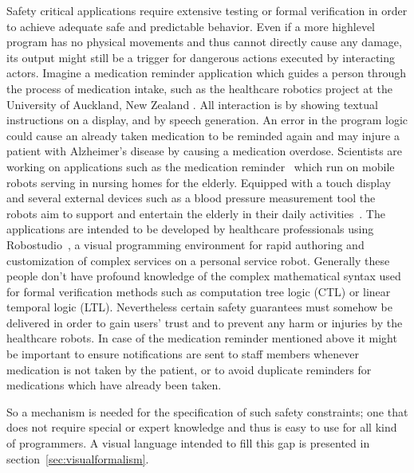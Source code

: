 \documentclass[conference]{IEEEtran}
\begin{document}
Safety critical applications require extensive testing or formal verification in order to achieve adequate safe and predictable behavior.
Even if a more highlevel program has no physical movements and thus cannot directly cause any damage, its output might still be a trigger for dangerous actions executed by interacting actors.
Imagine a medication reminder application which guides a person through the process of medication intake, such as the healthcare robotics project at the University of Auckland, New Zealand \cite{jayawardena12:_desig}. All interaction is by showing textual instructions on a display, and by speech generation. An error in the program logic could cause an already taken medication to be reminded again and may injure a patient with Alzheimer's disease by causing a medication overdose.
Scientists are working on applications such as the medication reminder~\cite{p11:_feasib} which run on mobile robots serving in nursing homes for the elderly. Equipped with a touch display and several external devices such as a blood pressure measurement tool the robots aim to support and entertain the elderly in their daily activities~\cite{jayawardena12:_desig,5649910}.
The applications are intended to be developed by healthcare professionals using Robostudio~\cite{robostudio}, a visual programming environment for rapid authoring and customization of complex services on a personal service robot.
Generally these people don't have profound knowledge of the complex mathematical syntax used for formal verification methods such as computation tree logic (CTL) or linear temporal logic (LTL). Nevertheless certain safety guarantees must somehow be delivered in order to gain users' trust and to prevent any harm or injuries by the healthcare robots.
In case of the medication reminder mentioned above it might be important to ensure notifications are sent to staff members whenever medication is not taken by the patient, or to avoid duplicate reminders for medications which have already been taken.

So a mechanism is needed for the specification of such safety constraints; one that does not require special or expert knowledge and thus is easy to use for all kind of programmers. A visual language intended to fill this gap is presented in section~\ref{sec:visualformalism}.
\end{document}
